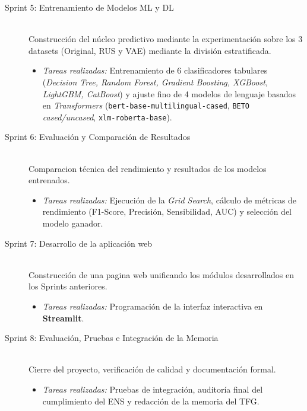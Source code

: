\documentclass[12pt,a4paper,onecolumn,oneside]{report}
\begin{document}
\begin{description}
    \item[Sprint 5: Entrenamiento de Modelos ML y DL] \hfill \\
    Construcción del núcleo predictivo mediante la experimentación sobre los 3 datasets (Original, RUS y VAE) mediante la división estratificada.
    \begin{itemize}
        \item \textit{Tareas realizadas:} Entrenamiento de 6 clasificadores tabulares (\textit{Decision Tree, Random Forest, Gradient Boosting, XGBoost, LightGBM, CatBoost}) y ajuste fino de 4 modelos de lenguaje basados en \textit{Transformers} (\texttt{bert-base-multilingual-cased}, \texttt{BETO} \textit{cased/uncased}, \texttt{xlm-roberta-base}).
    \end{itemize}
        
    \item[Sprint 6: Evaluación y Comparación de Resultados] \hfill \\
    Comparacion técnica del rendimiento y resultados de los modelos entrenados.
    \begin{itemize}
        \item \textit{Tareas realizadas:} Ejecución de la \textit{Grid Search}, cálculo de métricas de rendimiento (F1-Score, Precisión, Sensibilidad, AUC) y selección del modelo ganador.
    \end{itemize}
    
    \item[Sprint 7: Desarrollo de la aplicación web] \hfill \\
    Construcción de una pagina web unificando los módulos desarrollados en los Sprints anteriores.
    \begin{itemize}
        \item \textit{Tareas realizadas:} Programación de la interfaz interactiva en \textbf{Streamlit}.
    \end{itemize}
    
    \item[Sprint 8: Evaluación, Pruebas e Integración de la Memoria] \hfill \\
    Cierre del proyecto, verificación de calidad y documentación formal.
    \begin{itemize}
        \item \textit{Tareas realizadas:} Pruebas de integración, auditoría final del cumplimiento del ENS y redacción de la memoria del TFG.
    \end{itemize}
\end{description}
\end{document}
